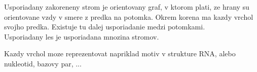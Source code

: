 \begin{definice}\label{def:strom}
	Usporiadany zakoreneny strom je orientovany graf, v ktorom plati, ze hrany su orientovane
	vzdy v smere z predka na potomka. Okrem korena ma kazdy vrchol svojho predka. Existuje tu
	dalej usporiadanie medzi potomkami.
	\\
	Usporiadany les je usporiadana mnozina stromov.
\end{definice}

Kazdy vrchol moze reprezentovat napriklad motiv v strukture RNA, alebo nukleotid, bazovy par, ...

